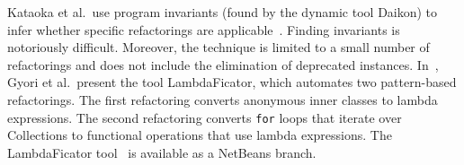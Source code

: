 \documentclass[conference]{IEEEtran}
\begin{document}
%
%
%
%
Kataoka et al.~use program invariants (found by the dynamic tool Daikon) to
infer
%
%
whether specific refactorings are
applicable~\cite{Kataoka:2001:ASP:846228.848644}.  Finding invariants is
notoriously difficult.  Moreover, the technique is limited to a small number
of refactorings and does not include the elimination of deprecated
instances.  In~\cite{conf/sigsoft/GyoriFDL13}, Gyori et al.~present the tool
{\sc LambdaFicator}, which automates two pattern-based refactorings.  The
first refactoring converts anonymous inner classes to lambda expressions. 
The second refactoring converts {\tt for} loops that iterate over
Collections to functional operations that use lambda expressions.  The {\sc
LambdaFicator} tool~\cite{DBLP:conf/icse/FranklinGLD04} is available as a
NetBeans branch.



%
%
%
\end{document}
